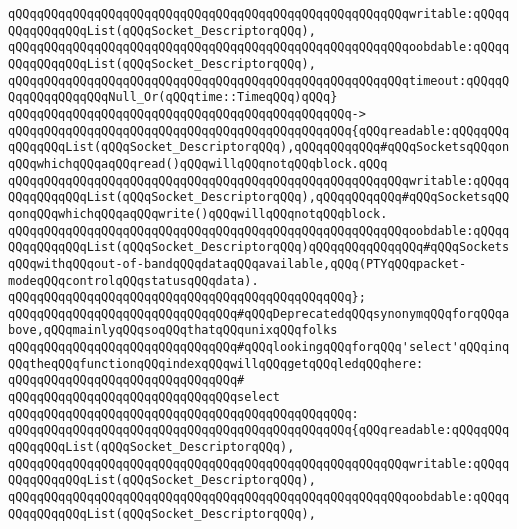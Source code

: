 \verb|qQQqqQQqqQQqqQQqqQQqqQQqqQQqqQQqqQQqqQQqqQQqqQQqqQQqqQQqwritable:qQQqqQQqqQQqqQQqList(qQQqSocket_DescriptorqQQq),|\newline
\verb|qQQqqQQqqQQqqQQqqQQqqQQqqQQqqQQqqQQqqQQqqQQqqQQqqQQqqQQqoobdable:qQQqqQQqqQQqqQQqList(qQQqSocket_DescriptorqQQq),|\newline
\verb|qQQqqQQqqQQqqQQqqQQqqQQqqQQqqQQqqQQqqQQqqQQqqQQqqQQqqQQqtimeout:qQQqqQQqqQQqqQQqqQQqNull_Or(qQQqtime::TimeqQQq)qQQq}|\newline
\verb|qQQqqQQqqQQqqQQqqQQqqQQqqQQqqQQqqQQqqQQqqQQqqQQq->|\newline
\verb|qQQqqQQqqQQqqQQqqQQqqQQqqQQqqQQqqQQqqQQqqQQqqQQq{qQQqreadable:qQQqqQQqqQQqqQQqList(qQQqSocket_DescriptorqQQq),qQQqqQQqqQQq#qQQqSocketsqQQqonqQQqwhichqQQqaqQQqread()qQQqwillqQQqnotqQQqblock.qQQq|\newline
\verb|qQQqqQQqqQQqqQQqqQQqqQQqqQQqqQQqqQQqqQQqqQQqqQQqqQQqqQQqwritable:qQQqqQQqqQQqqQQqList(qQQqSocket_DescriptorqQQq),qQQqqQQqqQQq#qQQqSocketsqQQqonqQQqwhichqQQqaqQQqwrite()qQQqwillqQQqnotqQQqblock.|\newline
\verb|qQQqqQQqqQQqqQQqqQQqqQQqqQQqqQQqqQQqqQQqqQQqqQQqqQQqqQQqoobdable:qQQqqQQqqQQqqQQqList(qQQqSocket_DescriptorqQQq)qQQqqQQqqQQqqQQq#qQQqSocketsqQQqwithqQQqout-of-bandqQQqdataqQQqavailable,qQQq(PTYqQQqpacket-modeqQQqcontrolqQQqstatusqQQqdata).|\newline
\verb|qQQqqQQqqQQqqQQqqQQqqQQqqQQqqQQqqQQqqQQqqQQqqQQq};|\newline
\newline
\verb|qQQqqQQqqQQqqQQqqQQqqQQqqQQqqQQq#qQQqDeprecatedqQQqsynonymqQQqforqQQqabove,qQQqmainlyqQQqsoqQQqthatqQQqunixqQQqfolks|\newline
\verb|qQQqqQQqqQQqqQQqqQQqqQQqqQQqqQQq#qQQqlookingqQQqforqQQq'select'qQQqinqQQqtheqQQqfunctionqQQqindexqQQqwillqQQqgetqQQqledqQQqhere:|\newline
\verb|qQQqqQQqqQQqqQQqqQQqqQQqqQQqqQQq#|\newline
\verb|qQQqqQQqqQQqqQQqqQQqqQQqqQQqqQQqselect|\newline
\verb|qQQqqQQqqQQqqQQqqQQqqQQqqQQqqQQqqQQqqQQqqQQqqQQq:|\newline
\verb|qQQqqQQqqQQqqQQqqQQqqQQqqQQqqQQqqQQqqQQqqQQqqQQq{qQQqreadable:qQQqqQQqqQQqqQQqList(qQQqSocket_DescriptorqQQq),|\newline
\verb|qQQqqQQqqQQqqQQqqQQqqQQqqQQqqQQqqQQqqQQqqQQqqQQqqQQqqQQqwritable:qQQqqQQqqQQqqQQqList(qQQqSocket_DescriptorqQQq),|\newline
\verb|qQQqqQQqqQQqqQQqqQQqqQQqqQQqqQQqqQQqqQQqqQQqqQQqqQQqqQQqoobdable:qQQqqQQqqQQqqQQqList(qQQqSocket_DescriptorqQQq),|\newline
